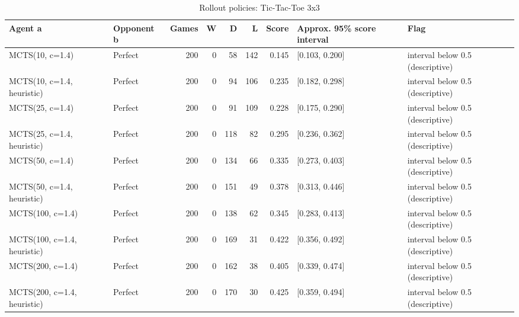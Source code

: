 \begin{table}[!t]
\centering
\caption{Rollout policies: Tic-Tac-Toe 3x3}
\label{tab:rollout_ttt3}
\small
\begin{tabular}{llrrrrrll}
\toprule
Agent a & Opponent b & Games & W & D & L & Score & Approx. 95\% score interval & Flag \\
\midrule
MCTS(10, c=1.4) & Perfect & 200 & 0 & 58 & 142 & 0.145 & [0.103, 0.200] & interval below 0.5 (descriptive) \\
MCTS(10, c=1.4, heuristic) & Perfect & 200 & 0 & 94 & 106 & 0.235 & [0.182, 0.298] & interval below 0.5 (descriptive) \\
MCTS(25, c=1.4) & Perfect & 200 & 0 & 91 & 109 & 0.228 & [0.175, 0.290] & interval below 0.5 (descriptive) \\
MCTS(25, c=1.4, heuristic) & Perfect & 200 & 0 & 118 & 82 & 0.295 & [0.236, 0.362] & interval below 0.5 (descriptive) \\
MCTS(50, c=1.4) & Perfect & 200 & 0 & 134 & 66 & 0.335 & [0.273, 0.403] & interval below 0.5 (descriptive) \\
MCTS(50, c=1.4, heuristic) & Perfect & 200 & 0 & 151 & 49 & 0.378 & [0.313, 0.446] & interval below 0.5 (descriptive) \\
MCTS(100, c=1.4) & Perfect & 200 & 0 & 138 & 62 & 0.345 & [0.283, 0.413] & interval below 0.5 (descriptive) \\
MCTS(100, c=1.4, heuristic) & Perfect & 200 & 0 & 169 & 31 & 0.422 & [0.356, 0.492] & interval below 0.5 (descriptive) \\
MCTS(200, c=1.4) & Perfect & 200 & 0 & 162 & 38 & 0.405 & [0.339, 0.474] & interval below 0.5 (descriptive) \\
MCTS(200, c=1.4, heuristic) & Perfect & 200 & 0 & 170 & 30 & 0.425 & [0.359, 0.494] & interval below 0.5 (descriptive) \\
\bottomrule
\end{tabular}
\end{table}
